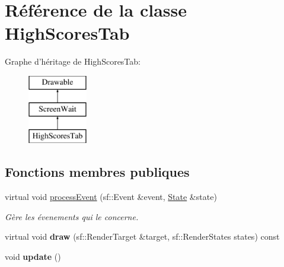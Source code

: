 \hypertarget{class_high_scores_tab}{\section{Référence de la classe High\+Scores\+Tab}
\label{class_high_scores_tab}
}
Graphe d'héritage de High\+Scores\+Tab\+:\begin{figure}[H]
\begin{center}
\leavevmode
\includegraphics[height=3.000000cm]{class_high_scores_tab}
\end{center}
\end{figure}
\subsection*{Fonctions membres publiques}
\begin{DoxyCompactItemize}
\item 
virtual void \hyperlink{class_high_scores_tab_aac7540750a5ca1d063d5d71967e5d5aa}{process\+Event} (sf\+::\+Event \&event, \hyperlink{gamestate_8h_a5d74787dedbc4e11c1ab15bf487e61f8}{State} \&state)
\begin{DoxyCompactList}\small\item\em Gère les évenements qui le concerne. \end{DoxyCompactList}\item 
\hypertarget{class_high_scores_tab_a51617bb6b6ccdc3fe174838035128eb6}{virtual void {\bfseries draw} (sf\+::\+Render\+Target \&target, sf\+::\+Render\+States states) const }\label{class_high_scores_tab_a51617bb6b6ccdc3fe174838035128eb6}

\item 
\hypertarget{class_high_scores_tab_a890d07b6d8cf34fefba5cfc685cb127d}{void {\bfseries update} ()}\label{class_high_scores_tab_a890d07b6d8cf34fefba5cfc685cb127d}

\end{DoxyCompactItemize}


